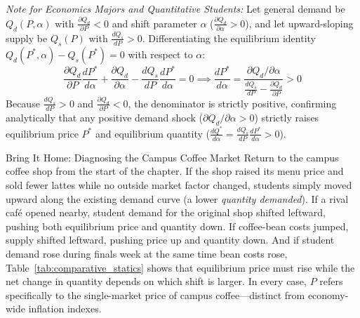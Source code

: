 \documentclass[11pt,letterpaper]{article}
\begin{document}
\begin{tcolorbox}[colback=CourseBlue!6!white,colframe=CourseBlue,title=\textbf{Optional Advanced Section: Comparative Statics via Total Differentiation}]
\small
\emph{Note for Economics Majors and Quantitative Students:}
Let general demand be $Q_d(P, \alpha)$ with $\frac{\partial Q_d}{\partial P} < 0$ and shift parameter $\alpha$ ($\frac{\partial Q_d}{\partial \alpha} > 0$), and let upward-sloping supply be $Q_s(P)$ with $\frac{dQ_s}{dP} > 0$. Differentiating the equilibrium identity $Q_d(P^*, \alpha) - Q_s(P^*) = 0$ with respect to $\alpha$:
\[
\frac{\partial Q_d}{\partial P} \frac{dP^*}{d\alpha} + \frac{\partial Q_d}{\partial \alpha} - \frac{dQ_s}{dP}\frac{dP^*}{d\alpha} = 0 \implies \frac{dP^*}{d\alpha} = \frac{\partial Q_d / \partial \alpha}{\frac{dQ_s}{dP} - \frac{\partial Q_d}{\partial P}} > 0
\]
Because $\frac{dQ_s}{dP} > 0$ and $\frac{\partial Q_d}{\partial P} < 0$, the denominator is strictly positive, confirming analytically that any positive demand shock ($\partial Q_d / \partial \alpha > 0$) strictly raises equilibrium price $P^*$ and equilibrium quantity ($\frac{dQ^*}{d\alpha} = \frac{dQ_s}{dP}\frac{dP^*}{d\alpha} > 0$).
\end{tcolorbox}

\begin{examplecase}{Bring It Home: Diagnosing the Campus Coffee Market}
Return to the campus coffee shop from the start of the chapter. If the shop raised its menu price and sold fewer lattes while no outside market factor changed, students simply moved upward along the existing demand curve (a lower \emph{quantity demanded}). If a rival café opened nearby, student demand for the original shop shifted leftward, pushing both equilibrium price and quantity down. If coffee-bean costs jumped, supply shifted leftward, pushing price up and quantity down. And if student demand rose during finals week at the same time bean costs rose, Table~\ref{tab:comparative_statics} shows that equilibrium price must rise while the net change in quantity depends on which shift is larger. In every case, $P$ refers specifically to the single-market price of campus coffee—distinct from economy-wide inflation indexes.
\end{examplecase}
\end{document}
